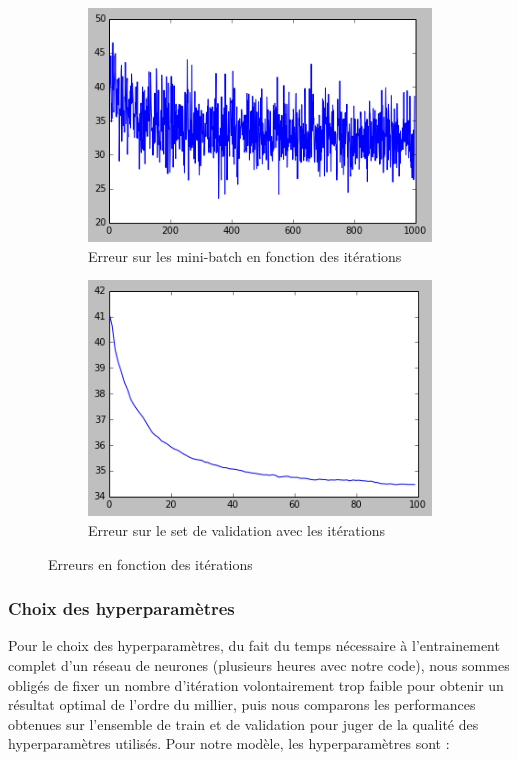 \documentclass[conference]{IEEEtran}
\begin{document}
\begin{figure}[h]
\begin{subfigure}{0.48\columnwidth}
\includegraphics[width=\textwidth]{fig/courbeMbeRprop.png}
\caption{Erreur sur les mini-batch en fonction des itérations}
\end{subfigure}
\begin{subfigure}{0.48\columnwidth}
\includegraphics[width=\textwidth]{fig/CourbeValRprop.png}
\caption{Erreur sur le set de validation avec les itérations}
\end{subfigure}
\caption{Erreurs en fonction des itérations}
\label{RpropErreur}
\end{figure}

\subsubsection{Choix des hyperparamètres}
Pour le choix des hyperparamètres, du fait du temps nécessaire à l'entrainement complet d'un réseau de neurones (plusieurs heures avec notre code), nous sommes obligés de fixer un nombre d'itération volontairement trop faible pour obtenir un résultat optimal de l'ordre du millier, puis nous comparons les performances obtenues sur l'ensemble de train et de validation pour juger de la qualité des hyperparamètres utilisés. Pour notre modèle, les hyperparamètres sont : 
\end{document}
